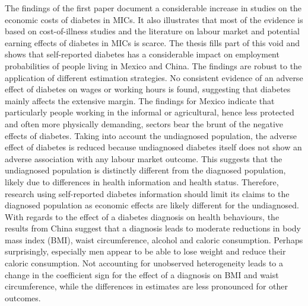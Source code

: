 The findings of the first paper document a considerable increase in studies on the economic costs of diabetes in MICs. It also illustrates that most of the evidence is based on cost-of-illness studies and the literature on labour market and potential earning effects of diabetes in MICs is scarce. The thesis fills part of this void and shows that self-reported diabetes has a considerable impact on employment probabilities of people living in Mexico and China. The findings are robust to the application of different estimation strategies. No consistent evidence of an adverse effect of diabetes on wages or working hours is found, suggesting that diabetes mainly affects the extensive margin. The findings for Mexico indicate that particularly people working in the informal or agricultural, hence less protected and often more physically demanding, sectors bear the brunt of the negative effects of diabetes. Taking into account the undiagnosed population, the adverse effect of diabetes is reduced because undiagnosed diabetes itself does not show an adverse association with any labour market outcome. This suggests that the undiagnosed population is distinctly different from the diagnosed population, likely due to differences in health information and health status. Therefore, research using self-reported diabetes information should limit its claims to the diagnosed population as economic effects are likely different for the undiagnosed. With regards to the effect of a diabetes diagnosis on health behaviours, the results from China suggest that a diagnosis leads to moderate reductions in body mass index (BMI), waist circumference, alcohol and caloric consumption. Perhaps surprisingly, especially men appear to be able to lose weight and reduce their caloric consumption. Not accounting for unobserved heterogeneity leads to a change in the coefficient sign for the effect of a diagnosis on BMI and waist circumference, while the differences in estimates are less pronounced for other outcomes.



